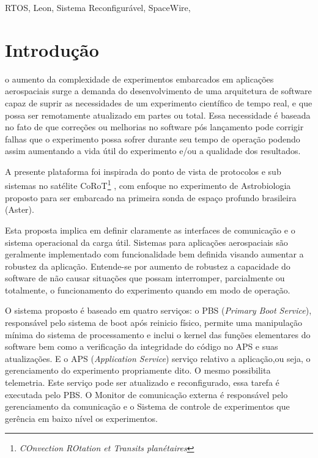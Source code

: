 \documentclass[journal,a4paper,oneside,twocolumn]{IEEEtran}
\begin{document}
\begin{IEEEkeywords}
	RTOS, Leon, Sistema Reconfigurável, SpaceWire, 
\end{IEEEkeywords}


\IEEEpeerreviewmaketitle



\section{Introdução}

	 o aumento da complexidade de experimentos embarcados em aplicações aerospaciais surge a demanda do desenvolvimento de uma arquitetura de software capaz de suprir as necessidades de um experimento científico  de tempo real, e que possa ser remotamente atualizado em partes ou total.
	Essa necessidade é baseada no fato de que correções ou melhorias no software pós lançamento pode corrigir falhas que o experimento possa sofrer durante seu tempo de operação podendo assim aumentando  a vida útil do experimento e/ou a qualidade dos resultados.
	
	 A presente plataforma foi inspirada do ponto de vista de protocolos e sub sistemas no satélite CoRoT\footnote{\textit{COnvection ROtation et Transits planétaires}} \cite{cailliau1999corot}, com enfoque no experimento de Astrobiologia proposto para ser  embarcado na primeira sonda de espaço profundo brasileira (Aster). 
	 
	 Esta proposta implica em definir claramente  as interfaces de comunicação e o sistema operacional da carga útil. Sistemas para aplicações aerospaciais são geralmente implementado com funcionalidade bem definida visando aumentar a robustez da aplicação. 	Entende-se por aumento de robustez a capacidade do software  de não causar situações que possam interromper, parcialmente ou totalmente, o funcionamento do experimento quando em modo de operação. 
	 
	 O sistema proposto é baseado em quatro serviços:  o PBS (\textit{Primary Boot Service}), responsável pelo sistema de boot após reinicio físico, permite uma manipulação mínima do sistema de processamento e inclui o kernel das funções elementares	 do software bem como a verificação da integridade do código no APS e suas atualizações. E o APS (\textit{Application Service}) serviço relativo a aplicação,ou seja, o gerenciamento do experimento propriamente dito. O mesmo possibilita telemetria. Este serviço pode ser atualizado e reconfigurado, essa tarefa é executada pelo PBS. O Monitor de comunicação externa é responsável pelo gerenciamento da comunicação e o Sistema de controle de experimentos que gerência em baixo nível os experimentos.
	 
\end{document}
